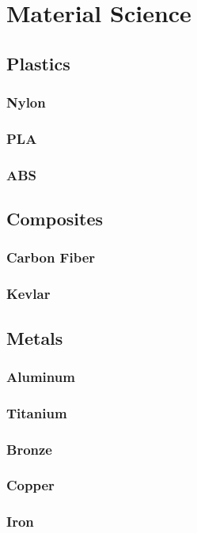 \chapter{Material Science}

\section{Plastics}
\subsection{Nylon}
\subsection{PLA}
\subsection{ABS}

\section{Composites}
\subsection{Carbon Fiber}
\subsection{Kevlar}

\section{Metals}
\subsection{Aluminum}
\subsection{Titanium}
\subsection{Bronze}
\subsection{Copper}
\subsection{Iron}
